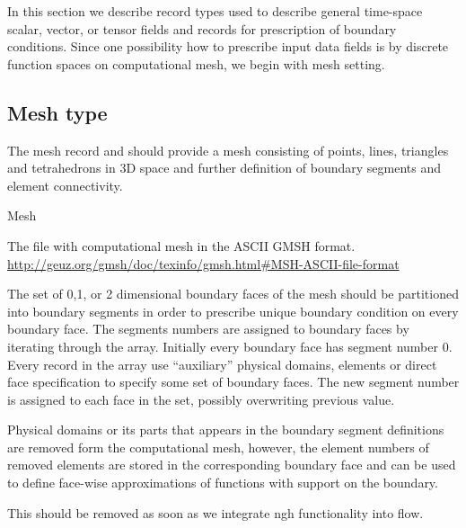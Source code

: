 \documentclass[12pt,a4paper]{report}
\begin{document}
\def\enumhead#1{
{\bf #1} enum cases:
}
\def\enumitem#1#2{
  \par{\tt #1=#2 \hspace{2em}}
}

In this section we describe record types used to describe general time-space scalar, vector, or tensor fields
and records for prescription of boundary conditions. Since one possibility how to prescribe input data fields is by 
discrete function spaces on computational mesh, we begin with mesh setting.

\subsection{Mesh type}
The mesh record and should provide a mesh consisting of points, lines, triangles and tetrahedrons in 3D space and further
definition of boundary segments and element connectivity.

\begin{recordtype}{Mesh}{}

The file with computational mesh in the ASCII GMSH format.\\
\url{http://geuz.org/gmsh/doc/texinfo/gmsh.html#MSH-ASCII-file-format}

The set of 0,1, or 2 dimensional boundary faces of the mesh should be partitioned into boundary segments in order to prescribe unique boundary condition 
on every boundary face. 
The segments numbers are assigned to boundary faces by iterating through the array. Initially every boundary face has segment number $0$. 
Every record in the array use ``auxiliary'' physical domains, elements or direct face specification to specify some set of boundary faces. The new segment number
is assigned to each face in the set, possibly overwriting previous value.

Physical domains or its parts that appears in the boundary segment definitions are removed form the computational mesh, however, the element
numbers of removed elements are stored in the corresponding boundary face and can be used to define face-wise approximations of functions with 
support on the boundary.

This should be removed as soon as we integrate ngh functionality into flow.
\end{recordtype}
\end{document}
